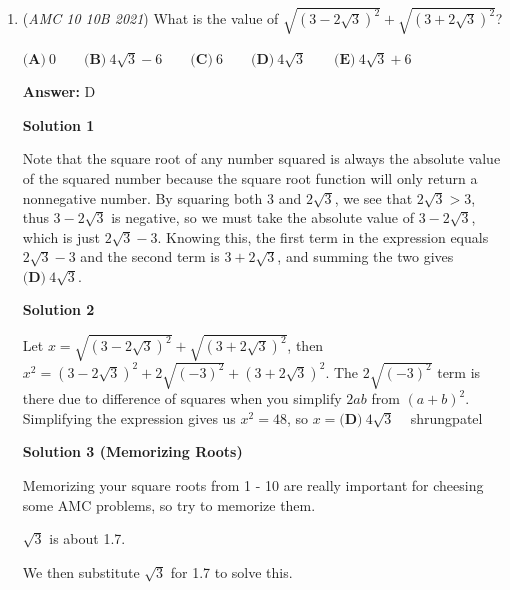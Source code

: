 \begin{enumerate}
\textbf{Solution 5}

There are an odd number of integer solutions $x$ to this inequality since if any non-zero integer $x$ satisfies this inequality, then so does $-x,$ and we must also account for $0,$ which gives us the desired. Then, the answer is either $\textbf{(A)}$ or $\textbf{(D)},$ and since $3 \pi > 3 \cdot 3 > 9,$ the answer is at least $9 \cdot 2 + 1 = 19,$ yielding $\boxed{\textbf{(D)} ~19}.$



	\item (\textit{AMC 10 10B 2021}) What is the value of $\sqrt{\left(3-2\sqrt{3}\right)^2}+\sqrt{\left(3+2\sqrt{3}\right)^2}$?


 $\textbf{(A)} ~0 \qquad\textbf{(B)} ~4\sqrt{3}-6 \qquad\textbf{(C)} ~6 \qquad\textbf{(D)} ~4\sqrt{3} \qquad\textbf{(E)} ~4\sqrt{3} + 6$

 \textbf{Answer: }D



\textbf{Solution 1}

Note that the square root of any number squared is always the absolute value of the squared number because the square root function will only return a nonnegative number. By squaring both $3$ and $2\sqrt{3}$, we see that $2\sqrt{3}>3$, thus $3-2\sqrt{3}$ is negative, so we must take the absolute value of $3-2\sqrt{3}$, which is just $2\sqrt{3}-3$. Knowing this, the first term in the expression equals $2\sqrt{3}-3$ and the second term is $3+2\sqrt3$, and summing the two gives $\boxed{\textbf{(D)} ~4\sqrt{3}}$. 

 



\textbf{Solution 2}

Let $x = \sqrt{(3-2\sqrt{3})^2}+\sqrt{(3+2\sqrt{3})^2}$, then $x^2 = (3-2\sqrt{3})^2+2\sqrt{(-3)^2}+(3+2\sqrt3)^2$. The $2\sqrt{(-3)^2}$ term is there due to difference of squares when you simplify $2ab$ from $(a + b)^2$. Simplifying the expression gives us $x^2 = 48$, so $x=\boxed{\textbf{(D)} ~4\sqrt{3}}$ ~ shrungpatel

 



\textbf{Solution 3 (Memorizing Roots)}

Memorizing your square roots from 1 - 10 are really important for cheesing some AMC problems, so try to memorize them.

 \( \sqrt{3} \) is about 1.7.

 We then substitute \( \sqrt{3} \) for 1.7 to solve this.


\end{enumerate}
